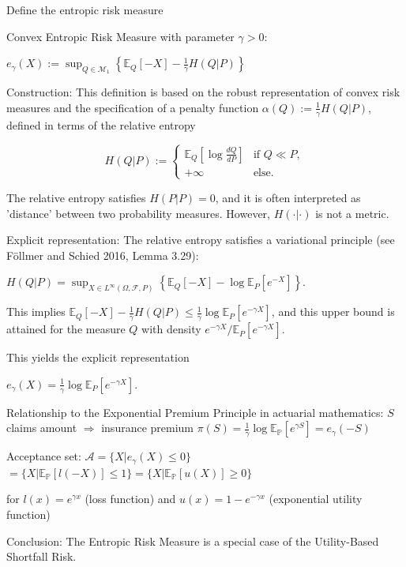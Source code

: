 {Define the entropic risk measure

Convex Entropic Risk Measure with parameter \(\gamma > 0\):

\(e_{\gamma}(X) := \sup_{Q \in \mathcal{M}_1} \left\{\mathbb{E}_{Q}[-X] - \frac{1}{\gamma} H(Q|P)\right\}\)

Construction:
This definition is based on the robust representation of convex risk measures and 
the specification of a penalty function \(\alpha(Q) := \frac{1}{\gamma} H(Q|P)\), defined in terms of the relative entropy

\[H(Q|P) := \begin{cases} 
\mathbb{E}_{Q}[\log \frac{dQ}{dP}] & \text{if } Q \ll P, \\
+\infty & \text{else.}
\end{cases}\]

The relative entropy satisfies \(H(P|P) = 0\), and it is often interpreted as 'distance' between two probability measures. 
However, \(H(\cdot|\cdot)\) is not a metric.

Explicit representation:
The relative entropy satisfies a variational principle (see Föllmer and Schied 2016, Lemma 3.29):

\(H(Q|P) = \sup_{X \in L^{\infty}(\Omega, \mathcal{F}, P)} \left\{\mathbb{E}_{Q}[-X] - \log \mathbb{E}_{P}[e^{-X}]\right\}.\)

This implies \(\mathbb{E}_{Q}[-X] - \frac{1}{\gamma} H(Q|P) \leq \frac{1}{\gamma} \log \mathbb{E}_{P}[e^{-\gamma X}]\), and this upper bound is attained for the measure \(Q\) with density \(e^{-\gamma X}/\mathbb{E}_{P}[e^{-\gamma X}]\).

This yields the explicit representation

\(e_{\gamma}(X) = \frac{1}{\gamma} \log \mathbb{E}_{P}[e^{-\gamma X}]\).


Relationship to the Exponential Premium Principle in actuarial mathematics:  
\(S\) claims amount \(\Rightarrow\) insurance premium 
\(\pi(S) = \frac{1}{\gamma} \log \mathbb{E}_{\mathbb{P}}[e^{\gamma S}] = e_{\gamma}(-S)\)  

Acceptance set:  
\(\mathcal{A} = \{X | e_{\gamma}(X) \leq 0\}\)  
\(= \{X | \mathbb{E}_{\mathbb{P}}[l(-X)] \leq 1\} = \{X | \mathbb{E}_{\mathbb{P}}[u(X)] \geq 0\}\)  

for \(l(x) = e^{\gamma x}\) (loss function) and \(u(x) = 1 - e^{-\gamma x}\) (exponential utility function)  

Conclusion: The Entropic Risk Measure is a special case of the Utility-Based Shortfall Risk.


}
